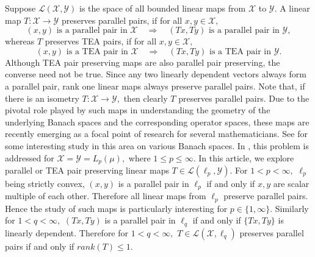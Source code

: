 \documentclass{amsart}
\theoremstyle{definition}
\theoremstyle{remark}
\numberwithin{equation}{section}
\begin{document}
Suppose $\mathcal{L}(\mathcal{X},\mathcal{Y})$ is the space of all bounded linear maps from $\mathcal{X}$ to $\mathcal{Y}.$   A linear map $T:\mathcal{X}\to \mathcal{Y}$ preserves parallel pairs, if for all $ x,y\in \mathcal{X},$
\[(x,y) \text{ is a parallel pair in } \mathcal{X} \quad \Rightarrow \quad  (Tx,Ty) \text{ is a parallel pair in } \mathcal{Y},\] 
whereas $T$ preserves TEA pairs, if for all $ x,y\in \mathcal{X},$
\[(x,y) \text{ is a TEA pair in } \mathcal{X} \quad \Rightarrow \quad  (Tx,Ty) \text{ is a TEA pair in } \mathcal{Y}.\] 
Although TEA pair preserving maps are also parallel pair preserving, the converse need not be true.
Since any two linearly dependent vectors always form a parallel pair, rank one linear maps always preserve parallel pairs. Note that, if there is an isometry $T:\mathcal{X}\to \mathcal{Y},$ then clearly $T$ preserves parallel pairs. Due to the pivotal role played by such maps in understanding the geometry of the underlying Banach spaces and the corresponding operator spaces,  these maps are recently emerging as a focal point of research for several mathematicians. See  \cite{KLPS,KLSP,LTWW, LTWW2, M,MMPS} for some interesting study in this area on various Banach spaces.  In \cite{LTWW}, this problem is addressed for $\mathcal{X}=\mathcal{Y}=L_p(\mu),$ where $1\leq p\leq \infty.$   In this article, we explore parallel or TEA pair preserving linear maps $T\in \mathcal{L}(\ell_p, \mathcal{Y}).$   For $1<p<\infty,$ $\ell_p$ being strictly convex, $(x,y)$ is a parallel pair in $\ell_p$ if and only if $x,y$ are scalar multiple of each other. Therefore all linear maps from $\ell_p$ preserve parallel pairs. Hence the study of such maps is particularly interesting for $p\in\{1,\infty\}.$ Similarly for $1<q<\infty,$ $(Tx,Ty)$ is a parallel pair in $\ell_q$ if and only if $\{Tx,Ty\}$ is linearly dependent. Therefore  for $1<q<\infty,$  $T\in \mathcal{L}(\mathcal{X},\ell_q)$ preserves parallel pairs if and only if $rank(T)\leq 1.$ %
 \\
   
\end{document}
